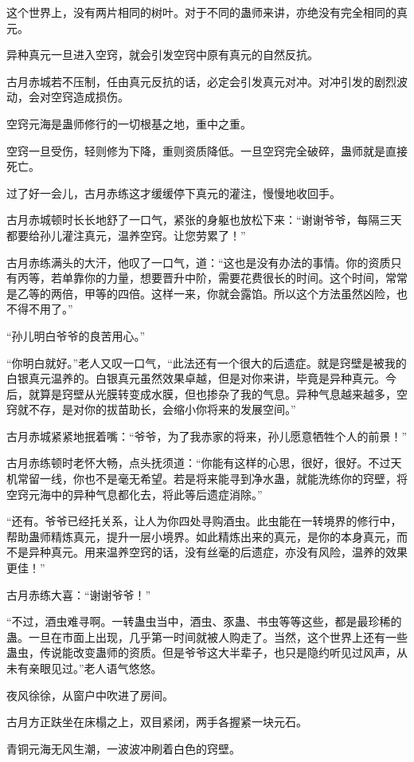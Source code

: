 \begin{this_body}
这个世界上，没有两片相同的树叶。对于不同的蛊师来讲，亦绝没有完全相同的真元。

异种真元一旦进入空窍，就会引发空窍中原有真元的自然反抗。

古月赤城若不压制，任由真元反抗的话，必定会引发真元对冲。对冲引发的剧烈波动，会对空窍造成损伤。

空窍元海是蛊师修行的一切根基之地，重中之重。

空窍一旦受伤，轻则修为下降，重则资质降低。一旦空窍完全破碎，蛊师就是直接死亡。

过了好一会儿，古月赤练这才缓缓停下真元的灌注，慢慢地收回手。

古月赤城顿时长长地舒了一口气，紧张的身躯也放松下来：“谢谢爷爷，每隔三天都要给孙儿灌注真元，温养空窍。让您劳累了！”

古月赤练满头的大汗，他叹了一口气，道：“这也是没有办法的事情。你的资质只有丙等，若单靠你的力量，想要晋升中阶，需要花费很长的时间。这个时间，常常是乙等的两倍，甲等的四倍。这样一来，你就会露馅。所以这个方法虽然凶险，也不得不用了。”

“孙儿明白爷爷的良苦用心。”

“你明白就好。”老人又叹一口气，“此法还有一个很大的后遗症。就是窍壁是被我的白银真元温养的。白银真元虽然效果卓越，但是对你来讲，毕竟是异种真元。今后，就算是窍壁从光膜转变成水膜，但也掺杂了我的气息。异种气息越来越多，空窍就不存，是对你的拔苗助长，会缩小你将来的发展空间。”

古月赤城紧紧地抿着嘴：“爷爷，为了我赤家的将来，孙儿愿意牺牲个人的前景！”

古月赤练顿时老怀大畅，点头抚须道：“你能有这样的心思，很好，很好。不过天机常留一线，你也不是毫无希望。若是将来能寻到净水蛊，就能洗练你的窍壁，将空窍元海中的异种气息都化去，将此等后遗症消除。”

“还有。爷爷已经托关系，让人为你四处寻购酒虫。此虫能在一转境界的修行中，帮助蛊师精炼真元，提升一层小境界。如此精炼出来的真元，是你的本身真元，而不是异种真元。用来温养空窍的话，没有丝毫的后遗症，亦没有风险，温养的效果更佳！”

古月赤练大喜：“谢谢爷爷！”

“不过，酒虫难寻啊。一转蛊虫当中，酒虫、豕蛊、书虫等等这些，都是最珍稀的蛊。一旦在市面上出现，几乎第一时间就被人购走了。当然，这个世界上还有一些蛊虫，传说能改变蛊师的资质。但是爷爷这大半辈子，也只是隐约听见过风声，从未有亲眼见过。”老人语气悠悠。

夜风徐徐，从窗户中吹进了房间。

古月方正趺坐在床榻之上，双目紧闭，两手各握紧一块元石。

青铜元海无风生潮，一波波冲刷着白色的窍壁。


\end{this_body}
